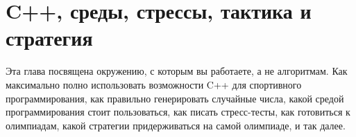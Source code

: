 
\part{C++, среды, стрессы, тактика и стратегия}

Эта глава посвящена окружению, с которым вы работаете, а не алгоритмам. Как максимально полно использовать возможности C++ для спортивного программирования, как правильно генерировать случайные числа, какой средой программирования стоит пользоваться, как писать стресс-тесты, как готовиться к олимпиадам, какой стратегии придерживаться на самой олимпиаде, и так далее.












